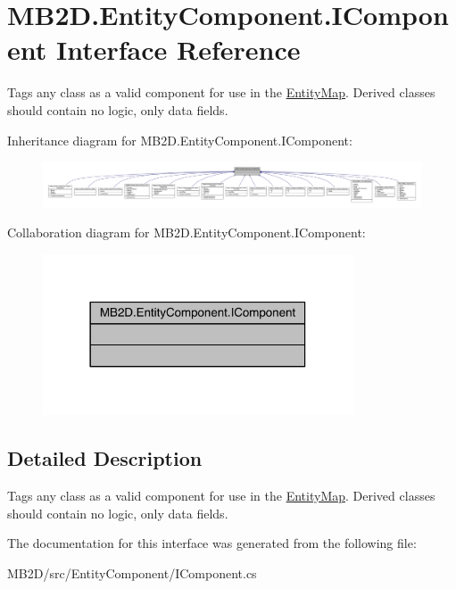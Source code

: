 \hypertarget{interface_m_b2_d_1_1_entity_component_1_1_i_component}{}\section{M\+B2\+D.\+Entity\+Component.\+I\+Component Interface Reference}
\label{interface_m_b2_d_1_1_entity_component_1_1_i_component}


Tags any class as a valid component for use in the \hyperlink{class_m_b2_d_1_1_entity_component_1_1_entity_map}{Entity\+Map}. Derived classes should contain no logic, only data fields.  




Inheritance diagram for M\+B2\+D.\+Entity\+Component.\+I\+Component\+:\nopagebreak
\begin{figure}[H]
\begin{center}
\leavevmode
\includegraphics[width=350pt]{interface_m_b2_d_1_1_entity_component_1_1_i_component__inherit__graph}
\end{center}
\end{figure}


Collaboration diagram for M\+B2\+D.\+Entity\+Component.\+I\+Component\+:\nopagebreak
\begin{figure}[H]
\begin{center}
\leavevmode
\includegraphics[width=261pt]{interface_m_b2_d_1_1_entity_component_1_1_i_component__coll__graph}
\end{center}
\end{figure}


\subsection{Detailed Description}
Tags any class as a valid component for use in the \hyperlink{class_m_b2_d_1_1_entity_component_1_1_entity_map}{Entity\+Map}. Derived classes should contain no logic, only data fields. 



The documentation for this interface was generated from the following file\+:\begin{DoxyCompactItemize}
\item 
M\+B2\+D/src/\+Entity\+Component/I\+Component.\+cs\end{DoxyCompactItemize}
